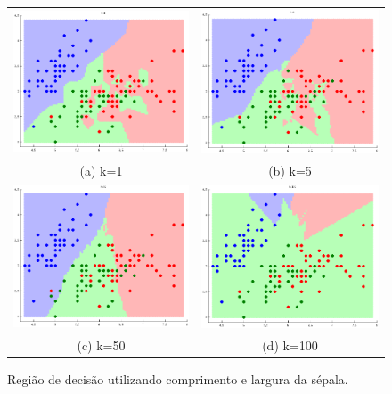\documentclass[
	article,			%
	11pt,				%
	oneside,			%
	a4paper,			%
	english,			%
	brazil,				%
	]{abntex2}
\begin{document}
\begin{figure}
	\centering
	\begin{tabular}{cc}
	  \includegraphics[width=70mm]{figuras/sepLVssepW/decRegK1.eps} &  
	  \includegraphics[width=70mm]{figuras/sepLVssepW/decRegK5.eps}
	  \\
	(a) k=1 & (b) k=5 \\[6pt] 
	 \includegraphics[width=70mm]{figuras/sepLVssepW/decRegK50.eps} &  
	 \includegraphics[width=70mm]{figuras/sepLVssepW/decRegK100.eps} \\
	(c) k=50 & (d) k=100 \\[6pt] 

	\end{tabular}
	\label{fig:decisionRegionSepL_SepW}
	\caption{Região de decisão utilizando comprimento e largura da sépala.}
\end{figure}
\end{document}
